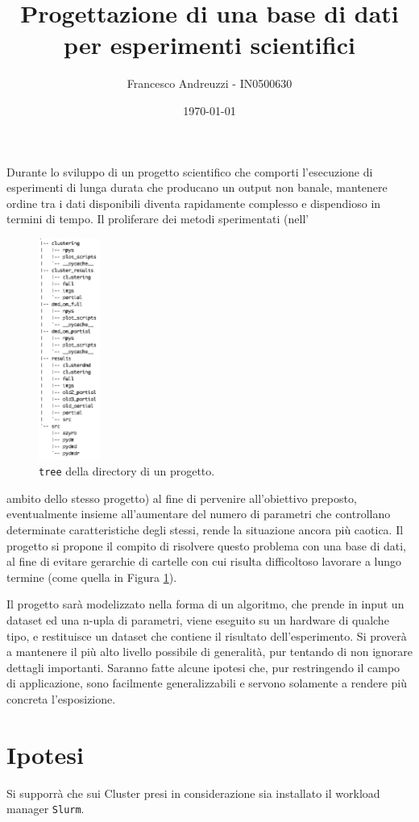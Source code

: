 \documentclass{article}
\title{Progettazione di una base di dati per esperimenti scientifici}
\author{Francesco Andreuzzi - IN0500630}
\date{\today}
\begin{document}
\maketitle

Durante lo sviluppo di un progetto scientifico che comporti l'esecuzione di esperimenti di lunga durata che producano un output non banale, mantenere ordine tra i dati disponibili diventa rapidamente complesso e dispendioso in termini di tempo. Il proliferare dei metodi sperimentati (nell'\hphantom{xcjxxsksjskksksk}
\begin{figure}
    \vspace{-0.9cm}
    \includegraphics[width=2cm]{res/tree_brutto.png}
    \caption{\texttt{tree} della directory di un progetto.}\label{fig:tree}
\end{figure}
ambito dello stesso progetto) al fine di pervenire all'obiettivo preposto, eventualmente insieme all'aumentare del numero di parametri che controllano determinate caratteristiche degli stessi, rende la situazione ancora più caotica.  Il progetto si propone il compito di risolvere questo problema con una base di dati, al fine di evitare gerarchie di cartelle con cui risulta difficoltoso lavorare a lungo termine (come quella in Figura \ref{fig:tree}).

Il progetto sarà modelizzato nella forma di un algoritmo, che prende in input un dataset ed una n-upla di parametri, viene eseguito su un hardware di qualche tipo, e restituisce un dataset che contiene il risultato dell'esperimento. Si proverà a mantenere il più alto livello possibile di generalità, pur tentando di non ignorare dettagli importanti. Saranno fatte alcune ipotesi che, pur restringendo il campo di applicazione, sono facilmente generalizzabili e servono solamente a rendere più concreta l'esposizione.

\section{Ipotesi}
\label{sec:ipotesi}
Si supporrà che sui Cluster presi in considerazione sia installato il workload manager \texttt{Slurm}.
\end{document}
